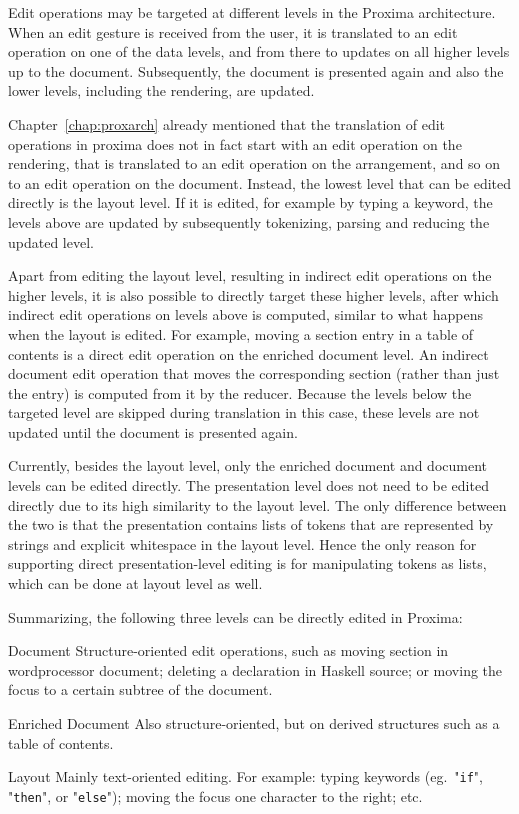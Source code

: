 
\bc Edit operations may be targeted at different levels in the Proxima architecture. When an edit gesture is received from the user, it is translated to an edit operation on one of the data levels, and from there to updates on all higher levels up to the document. Subsequently, the document is presented again and also the lower levels, including the rendering, are updated. \ec

Chapter~\ref{chap:proxarch} already mentioned that the translation of edit operations in proxima does not in fact start with an edit operation on the rendering, that is translated to an edit operation on the arrangement, and so on to an edit operation on the document. Instead, the lowest level that can be edited directly is the layout level. If it is edited, for example by typing a keyword, the levels above are updated by subsequently tokenizing, parsing and reducing the updated level.

Apart from editing the layout level, resulting in indirect edit operations on the higher levels, it is also possible to directly target these higher levels, after which indirect edit operations on levels above is computed, similar to what happens when the layout is edited. For example, moving a section entry in a table of contents is a direct edit operation on the enriched document level. An indirect document edit operation that moves the corresponding section (rather than just the entry) is computed from it by the reducer. Because the levels below the targeted level are skipped during translation in this case, these levels are not updated until the document is presented again. 

Currently, besides the layout level, only the enriched document and document levels can be edited directly. The presentation level does not need to be edited directly due to its high similarity to the layout level. The only difference between the two is that the presentation contains lists of tokens that are represented by strings and explicit whitespace in the layout level. Hence the only reason for supporting direct presentation-level editing is for manipulating tokens as lists, which can be done at layout level as well.

Summarizing, the following three levels can be directly edited in Proxima:

\begin{description}
\item{Document} Structure-oriented edit operations, such as moving section in wordprocessor document; deleting a declaration in Haskell source; or moving the focus to a certain subtree of the document.
\item{Enriched Document} Also structure-oriented, but on derived structures such as a table of contents.
\item{Layout} Mainly text-oriented editing. For example: typing keywords (eg.\ "\verb|if|", "\verb|then|", or "\verb|else|"); moving the focus one character to the right; etc.
\end{description}


